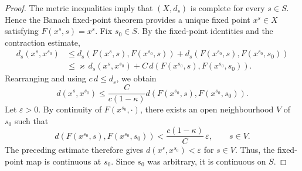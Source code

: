 \documentclass[reqno]{amsart}
\theoremstyle{plain}
\numberwithin{equation}{section}
\numberwithin{definition}{section}
\begin{document}
\begin{proof}
The metric inequalities imply that $(X,d_s)$ is complete
for every $s\in S$. Hence the Banach fixed-point theorem
provides a unique fixed point $x^s\in X$ satisfying $F(x^s,s)=x^s$.  Fix $s_0\in S$. By the fixed-point identities and the
contraction estimate,
\begin{equation*}
    \begin{aligned}
        d_s(x^s,x^{s_0})
        &\leq
        d_s(F(x^s,s),F(x^{s_0},s))
        +
        d_s(F(x^{s_0},s),F(x^{s_0},s_0))\\
        &\leq
        \varkappa\,d_s(x^s,x^{s_0})
        +
        C\,d(F(x^{s_0},s),F(x^{s_0},s_0)).
    \end{aligned}
\end{equation*}
Rearranging and using $c\,d\leq d_s$, we obtain
\begin{equation*}
    d(x^s,x^{s_0})
    \leq
    \frac{C}{c(1-\kappa)}
    d(F(x^{s_0},s),F(x^{s_0},s_0)).
\end{equation*}
Let $\varepsilon>0$. By continuity of
$F(x^{s_0},\cdot)$, there exists an open neighbourhood
$V$ of $s_0$ such that
\begin{equation*}
    d(F(x^{s_0},s),F(x^{s_0},s_0))
    <
    \frac{c(1-\kappa)}{C}\,\varepsilon,
    \qquad s\in V.
\end{equation*}
The preceding estimate therefore gives $d(x^s,x^{s_0})<\varepsilon$ for $s\in V$. 
Thus, the fixed-point map is continuous at $s_0$.
Since $s_0$ was arbitrary, it is continuous on $S$.
\end{proof}
\end{document}
